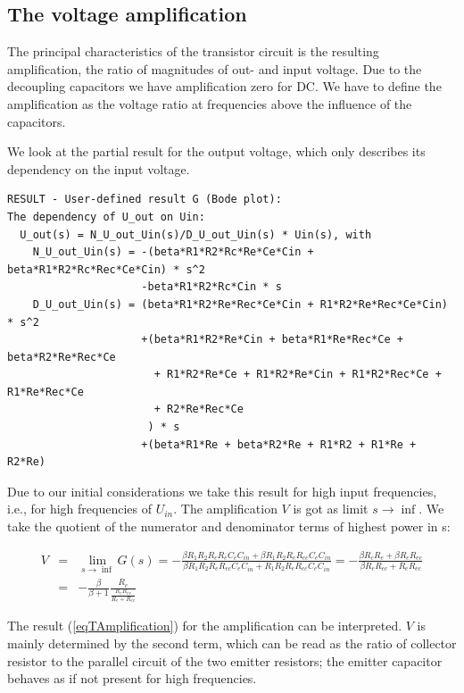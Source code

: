 \subsection{The voltage amplification}

The principal characteristics of the transistor circuit is the resulting
amplification, the ratio of magnitudes of out- and input voltage. Due to
the decoupling capacitors we have amplification zero for DC. We have to
define the amplification as the voltage ratio at frequencies above the
influence of the capacitors.

We look at the partial result for the output voltage, which only describes
its dependency on the input voltage.

\begin{verbatim}
RESULT - User-defined result G (Bode plot):
The dependency of U_out on Uin:
  U_out(s) = N_U_out_Uin(s)/D_U_out_Uin(s) * Uin(s), with
    N_U_out_Uin(s) = -(beta*R1*R2*Rc*Re*Ce*Cin + beta*R1*R2*Rc*Rec*Ce*Cin) * s^2
                     -beta*R1*R2*Rc*Cin * s
    D_U_out_Uin(s) = (beta*R1*R2*Re*Rec*Ce*Cin + R1*R2*Re*Rec*Ce*Cin) * s^2
                     +(beta*R1*R2*Re*Cin + beta*R1*Re*Rec*Ce + beta*R2*Re*Rec*Ce
                       + R1*R2*Re*Ce + R1*R2*Re*Cin + R1*R2*Rec*Ce + R1*Re*Rec*Ce
                       + R2*Re*Rec*Ce
                      ) * s
                     +(beta*R1*Re + beta*R2*Re + R1*R2 + R1*Re + R2*Re)
\end{verbatim}

Due to our initial considerations we take this result for high input
frequencies, i.e., for high frequencies of $U_{in}$. The amplification $V$
is got as limit $s \to \inf$. We take the quotient of the numerator and
denominator terms of highest power in s:

\begin{eqnarray}
V & = & \lim_{s \to \inf}G(s)
        = - \frac{\beta R_1 R_2 R_c R_e C_e C_{in} + \beta R_1 R_2 R_c R_{ec} C_e C_{in}}
                 {\beta R_1 R_2 R_e R_{ec} C_e C_{in} + R_1 R_2 R_e R_{ec} C_e C_{in}}
        = - \frac{\beta R_c R_e + \beta R_c R_{ec}}{\beta R_e R_{ec} + R_e R_{ec}}
\nonumber \\
  & = & - \frac{\beta}{\beta+1} \frac{R_c}{\frac{R_e R_{ec}}{R_e+R_{ec}}}
\label{eqTAmplification}
\end{eqnarray}

The result (\ref{eqTAmplification}) for the amplification can be
interpreted. $V$ is mainly determined by the second term, which can be
read as the ratio of collector resistor to the parallel circuit of the two
emitter resistors; the emitter capacitor behaves as if not present for
high frequencies.

